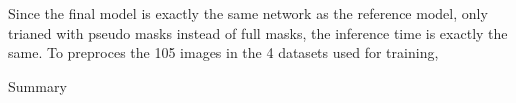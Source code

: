 Since the final model is exactly the same network as the reference model, only trianed with pseudo masks instead of full masks, the inference time is exactly the same.
To preproces the 105 images in the 4 datasets used for training, 


\begin{table}

    
    \caption{Summary
    }

\end{table}